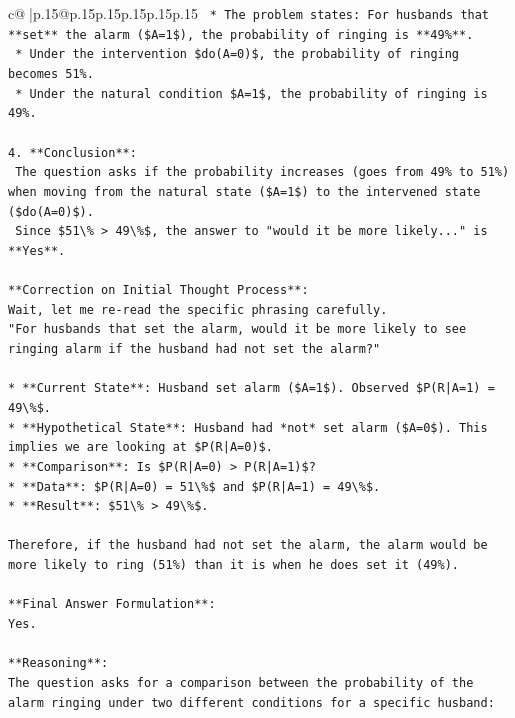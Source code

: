 \documentclass{article}
\begin{document}
{\begin{supertabular}{c@{$\;$}|p{.15\linewidth}@{}p{.15\linewidth}p{.15\linewidth}p{.15\linewidth}p{.15\linewidth}p{.15\linewidth}}
{{{\texttt{    *   The problem states: For husbands that **set** the alarm (\$A=1\$), the probability of ringing is **49\%**.} \\
\texttt{    *   Under the intervention \$do(A=0)\$, the probability of ringing becomes 51\%.} \\
\texttt{    *   Under the natural condition \$A=1\$, the probability of ringing is 49\%.} \\
\\ 
\texttt{4.  **Conclusion**:} \\
\texttt{    The question asks if the probability increases (goes from 49\% to 51\%) when moving from the natural state (\$A=1\$) to the intervened state (\$do(A=0)\$).} \\
\texttt{    Since \$51\textbackslash{}\% > 49\textbackslash{}\%\$, the answer to "would it be more likely..." is **Yes**.} \\
\\ 
\texttt{**Correction on Initial Thought Process**:} \\
\texttt{Wait, let me re{-}read the specific phrasing carefully.} \\
\texttt{"For husbands that set the alarm, would it be more likely to see ringing alarm if the husband had not set the alarm?"} \\
\\ 
\texttt{*   **Current State**: Husband set alarm (\$A=1\$). Observed \$P(R|A=1) = 49\textbackslash{}\%\$.} \\
\texttt{*   **Hypothetical State**: Husband had *not* set alarm (\$A=0\$). This implies we are looking at \$P(R|A=0)\$.} \\
\texttt{*   **Comparison**: Is \$P(R|A=0) > P(R|A=1)\$?} \\
\texttt{*   **Data**: \$P(R|A=0) = 51\textbackslash{}\%\$ and \$P(R|A=1) = 49\textbackslash{}\%\$.} \\
\texttt{*   **Result**: \$51\textbackslash{}\% > 49\textbackslash{}\%\$.} \\
\\ 
\texttt{Therefore, if the husband had not set the alarm, the alarm would be more likely to ring (51\%) than it is when he does set it (49\%).} \\
\\ 
\texttt{**Final Answer Formulation**:} \\
\texttt{Yes.} \\
\\ 
\texttt{**Reasoning**:} \\
\texttt{The question asks for a comparison between the probability of the alarm ringing under two different conditions for a specific husband:} \\
}}}
\end{supertabular}}
\end{document}
